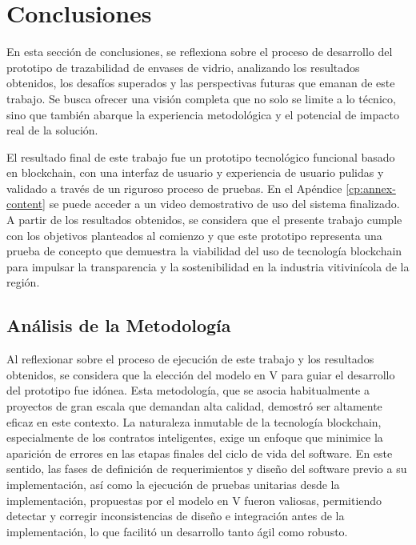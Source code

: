 \chapter[Conclusiones]{Conclusiones}
\label{cp:conclusions}

\parindent0pt

En esta sección de conclusiones, se reflexiona sobre el proceso de desarrollo del prototipo de trazabilidad de envases de vidrio, analizando los resultados obtenidos, los desafíos superados y las perspectivas futuras que emanan de este trabajo. Se busca ofrecer una visión completa que no solo se limite a lo técnico, sino que también abarque la experiencia metodológica y el potencial de impacto real de la solución. 

El resultado final de este trabajo fue un prototipo tecnológico funcional basado en blockchain, con una interfaz de usuario y experiencia de usuario pulidas y validado a través de un riguroso proceso de pruebas. En el Apéndice \ref{cp:annex-content} se puede acceder a un video demostrativo de uso del sistema finalizado. A partir de los resultados obtenidos, se considera que el presente trabajo cumple con los objetivos planteados al comienzo y que este prototipo representa una prueba de concepto que demuestra la viabilidad del uso de tecnología blockchain para impulsar la transparencia y la sostenibilidad en la industria vitivinícola de la región.

\section{Análisis de la Metodología}

Al reflexionar sobre el proceso de ejecución de este trabajo y los resultados obtenidos, se considera que la elección del modelo en V para guiar el desarrollo del prototipo fue idónea. Esta metodología, que se asocia habitualmente a proyectos de gran escala que demandan alta calidad, demostró ser altamente eficaz en este contexto. La naturaleza inmutable de la tecnología blockchain, especialmente de los contratos inteligentes, exige un enfoque que minimice la aparición de errores en las etapas finales del ciclo de vida del software. En este sentido, las fases de definición de requerimientos y diseño del software previo a su implementación, así como la ejecución de pruebas unitarias desde la implementación, propuestas por el modelo en V fueron valiosas, permitiendo detectar y corregir inconsistencias de diseño e integración antes de la implementación, lo que facilitó un desarrollo tanto ágil como robusto.

